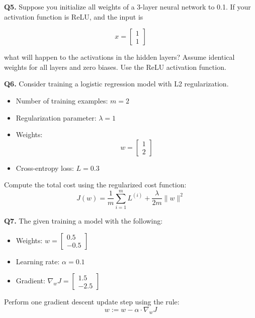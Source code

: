 \documentclass{article}
\begin{document}
\textbf{Q5.} Suppose you initialize all weights of a 3-layer neural network to 0.1. If your activation function is ReLU, and the input is

\[
x = 
\begin{bmatrix}
1 \\
1
\end{bmatrix}
\]

what will happen to the activations in the hidden layers?
Assume identical weights for all layers and zero biases. Use the ReLU activation function.
\vspace{1\baselineskip}

\textbf{Q6.} Consider training a logistic regression model with L2 regularization.

\begin{itemize}
    \item Number of training examples: \( m = 2 \)
    \item Regularization parameter: \( \lambda = 1 \)
    \item Weights: 
    \[
    w = 
    \begin{bmatrix}
    1 \\
    2
    \end{bmatrix}
    \]
    \item Cross-entropy loss: \( L = 0.3 \)
\end{itemize}

Compute the total cost using the regularized cost function:
\[
J(w) = \frac{1}{m} \sum_{i=1}^{m} L^{(i)} + \frac{\lambda}{2m} \|w\|^2
\]


\textbf{Q7.} The given training a model with the following:

\begin{itemize}
    \item Weights: \( w = 
    \begin{bmatrix}
    0.5 \\
    -0.5
    \end{bmatrix} \)
    \item Learning rate: \( \alpha = 0.1 \)
    \item Gradient: \( \nabla_w J = 
    \begin{bmatrix}
    1.5 \\
    -2.5
    \end{bmatrix} \)
\end{itemize}

Perform one gradient descent update step using the rule:
\[
w := w - \alpha \cdot \nabla_w J
\]
\end{document}
